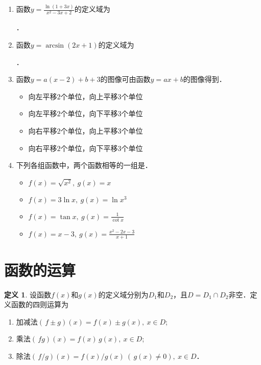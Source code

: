 \documentclass[a4paper,punct=CCT]{ctexbook}
\renewcommand*{\enumparen}[1]{（\makebox[0.6em][c]{\normalfont#1}）}
\theoremstyle{definition}
\newtheorem{definition}{定义}
\theoremstyle{remark}
\newif\ifshowsol
\let\leq\leqslant
\let\le\leq
\begin{document}
\begin{enumerate}
\item 函数\(\displaystyle y = \frac{\ln(1+3x)}{x^2-3x+2}\)的定义域为
  \ifshowsol
  \uline{\makebox[13em]{\(\brce{x \mid x > -1/3, x \ne 1, x \ne 2}\)}}．
  \else
  \uline{\makebox[13em]{}}．
  \fi

\item 函数\(y = \arcsin(2x+1)\)的定义域为
  \ifshowsol
  \uline{\makebox[9em]{\(\brce{x \mid -1/2 \le x \le 0}\)}}．
  \else
  \uline{\makebox[9em]{}}．
  \fi

\item 函数\(y = a(x-2) + b + 3\)的图像可由函数\(y = ax + b\)的图像\uline{\makebox[4em]{}}得到．
  \begin{itemize}
    \renewcommand{\labelitemi}{\faCircleThin}
  \item 向左平移\(2\)个单位，向上平移\(3\)个单位
  \item 向左平移\(2\)个单位，向下平移\(3\)个单位
    \ifshowsol
  \item[\faCircle] 向右平移\(2\)个单位，向上平移\(3\)个单位
    \else
  \item 向右平移\(2\)个单位，向上平移\(3\)个单位
    \fi
  \item 向右平移\(2\)个单位，向下平移\(3\)个单位
  \end{itemize}

\item 下列各组函数中，两个函数相等的一组是\uline{\makebox[4em]{}}．
  \begin{itemize}
    \renewcommand{\labelitemi}{\faCircleThin}
  \item \(f(x) = \sqrt{x^2},\ g(x) = x\)
    \ifshowsol
  \item[\faCircle] \(f(x) = 3\ln x,\ g(x) = \ln x^3\)
    \else
  \item \(f(x) = 3\ln x,\ g(x) = \ln x^3\)
    \fi
  \item \(f(x) = \tan x,\ g(x) = \frac1{\cot x}\)
  \item \(f(x) = x - 3,\ g(x) = \frac{x^2-2x-3}{x+1}\)
  \end{itemize}
\end{enumerate}
\fi

\section{函数的运算\label{sec:funcops}}

\begin{definition}
  \label{defn:func4ops}
  设函数\(f(x)\)和\(g(x)\)的定义域分别为\(D_1\)和\(D_2\)，且\(D = D_1 \cap D_2\)非空．定义函数的四则运算为
  \begin{enumerate}
    \renewcommand{\labelenumi}{\enumparen{\arabic{enumi}}}
  \item 加减法\((\,f \pm g)(x) = f(x) \pm g(x),\ x \in D\);
  \item 乘法\((\,fg)(x) = f(x) \, g(x),\ x \in D\);
  \item 除法\((\,f/g)(x) = f(x) / g(x)\ (\,g(x) \ne 0),\ x \in D\)．
  \end{enumerate}
\end{definition}
\end{document}
